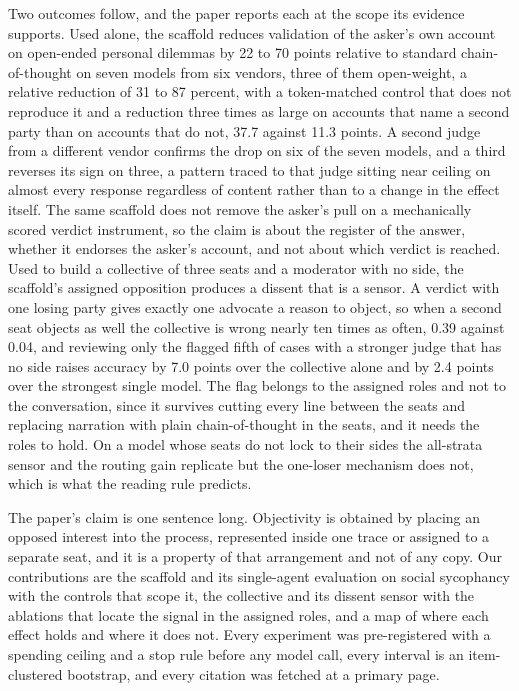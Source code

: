 Two outcomes follow, and the paper reports each at the scope its
evidence supports. Used alone, the scaffold reduces validation of the
asker's own account on open-ended personal dilemmas by 22 to 70 points
relative to standard chain-of-thought on seven models from six vendors,
three of them open-weight, a relative reduction of 31 to 87 percent,
with a token-matched control that does not reproduce it and a reduction
three times as large on accounts that name a second party than on accounts
that do not, 37.7 against 11.3 points. A second judge from a different
vendor confirms the drop on six of the seven models, and a third reverses
its sign on three, a pattern traced to that judge sitting near ceiling on
almost every response regardless of content rather than to a change in
the effect itself.
The same scaffold does not remove the asker's pull on a mechanically
scored verdict instrument,
so the claim is about the register of the answer, whether it endorses the
asker's account, and not about which verdict is reached.
Used to build a collective of three seats and a moderator with no side, the
scaffold's assigned opposition produces a dissent that is a sensor. A
verdict with one losing party gives exactly one advocate a reason to
object, so when a second seat objects as well the collective is wrong
nearly ten times as often, 0.39 against 0.04,
and reviewing only the flagged fifth of cases with a stronger judge that
has no side raises accuracy by 7.0 points over the collective alone
and by 2.4 points over the strongest single model.
The flag belongs to the assigned roles and not to the conversation, since
it survives cutting every line between the seats
and replacing narration with plain chain-of-thought in the seats,
and it needs the roles to hold. On a model whose seats do not lock to
their sides the all-strata sensor and the routing gain replicate but the
one-loser mechanism does not,
which is what the reading rule predicts.

The paper's claim is one sentence long. Objectivity is obtained by placing
an opposed interest into the process, represented inside one trace or
assigned to a separate seat, and it is a property of that arrangement and
not of any copy. Our contributions are the scaffold and its single-agent
evaluation on social sycophancy with the controls that scope it, the
collective and its dissent sensor with the ablations that locate the
signal in the assigned roles, and a map of where each effect holds and
where it does not. Every experiment was pre-registered with a spending
ceiling and a stop rule before any model call, every interval is an
item-clustered bootstrap, and every citation was fetched at a primary
page.
